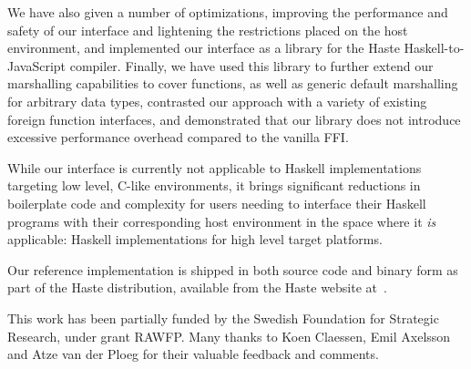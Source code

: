 \documentclass[preprint]{sigplanconf}
\begin{document}
We have also given a number of optimizations, improving the performance and
safety of our interface
and lightening the restrictions placed on the host environment, and implemented
our interface as a library for the Haste Haskell-to-JavaScript compiler.
Finally, we have used this library to further extend our marshalling
capabilities to cover functions, as well as generic default marshalling for
arbitrary data types, contrasted our approach with a variety of existing
foreign function interfaces, and demonstrated that our library does not
introduce excessive performance overhead compared to the vanilla FFI.

While our interface is currently not applicable to Haskell implementations
targeting low level, C-like environments, it brings significant reductions in
boilerplate code and complexity for users needing to interface their Haskell
programs with their corresponding host environment in the space where it
\emph{is} applicable: Haskell implementations for high level target platforms.

Our reference implementation is shipped in both source code and binary form as
part of the Haste distribution, available from the Haste website
at\ \cite{haste-lang.org}.

\acks
This work has been partially funded by the Swedish Foundation for Strategic Research, under grant RAWFP. Many thanks to Koen Claessen, Emil Axelsson and Atze van der Ploeg for their valuable feedback and comments.




\end{document}
